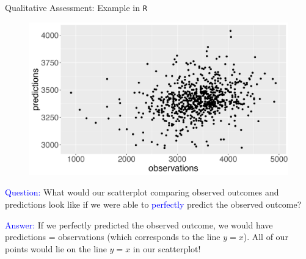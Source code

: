 \documentclass[10pt,t]{beamer}
\begin{document}
\begin{frame}{Qualitative Assessment: Example in \texttt{R}}
	\vspace{-0.6cm}
	\begin{figure}
		\centering \includegraphics[scale=0.3]{figures/predict_vs_obs.png}
	\end{figure}
	
	\textcolor{blue}{Question:} What would our scatterplot comparing observed outcomes and predictions look like if we were able to  \textcolor{blue}{perfectly} predict the observed outcome?  
	
	\vspace{0.3cm}
	
	\textcolor{blue}{Answer:} If we perfectly predicted the observed outcome, we would have predictions = observations (which corresponds to the line $y = x$). All of our points would lie on the line $y = x$ in our scatterplot!
	
\end{frame}
\end{document}
